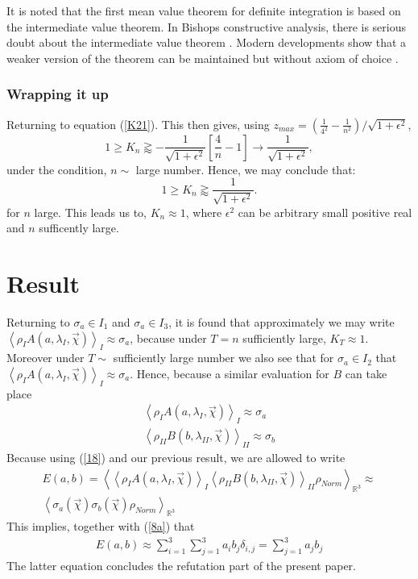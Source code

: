 \documentclass{appolb}
\begin{document}
It is noted that the first mean value theorem for definite integration is based on the intermediate value theorem. 
In Bishops constructive analysis, there is serious doubt about the intermediate value theorem \cite[ introduction section]{BISH}. Modern developments show that a weaker version of the theorem can be maintained but without axiom of choice \cite{Hen}. 
\subsubsection{Wrapping it up}\label{PartD}
Returning to equation (\ref{K21}). This then gives, using $z_{max}=\left( \frac{1}{4^2}-\frac{1}{n^2} \right)/\sqrt{1+\epsilon^2}$,
\begin{equation}\label{K22}
1 \geq K_n \gtrapprox -\frac{1}{\sqrt{1+\epsilon^2}}\left[\frac{4}{n} -1  \right]  \rightarrow  \frac{1}{\sqrt{1+\epsilon^2}},
\end{equation}
under the condition, $n \sim$ large number. 
Hence, we may conclude that: \[1 \geq  K_{n} \gtrapprox \frac{1}{\sqrt{1+\epsilon^2}}.\]
for $n$ large. This leads us to,  $K_n \approx 1$, where $\epsilon^2$ can be arbitrary small positive real and $n$ sufficently large. 

\section{Result}
Returning to $\sigma_a \in I_1$ and $\sigma_a \in I_3$, it is found that approximately we may write $\left \langle \rho_{I} A(a,\lambda_{I},\vec{\chi})\right\rangle_{I}\approx \sigma_a$, because under $T=n$ sufficiently large, $K_T \approx 1$. 
Moreover under $T \sim $ sufficiently large number we also see that for $\sigma_a \in I_2$ that $\left \langle \rho_{I} A(a,\lambda_{I},\vec{\chi})\right\rangle_{I}\approx \sigma_a$. Hence, because a similar evaluation for $B$ can take place
\begin{eqnarray}\label{R1}
\left \langle \rho_{I} A(a,\lambda_{I},\vec{\chi})\right\rangle_{I}\approx \sigma_a \nonumber \\
\left \langle \rho_{II} B(b,\lambda_{II},\vec{\chi})\right\rangle_{II}\approx \sigma_b
\end{eqnarray}
Because using (\ref{18}) and our previous result, we are allowed to write 
\begin{eqnarray}\label{R2}
E(a,b)=\left \langle \left \langle \rho_{I} A(a,\lambda_{I},\vec{\chi})\right\rangle_{I}\left \langle \rho_{II}B(b,\lambda_{II},\vec{\chi}) \right\rangle_{II}\rho_{Norm} \right\rangle_{\mathbb{R}^3}\approx \nonumber \\
\left \langle \sigma_a (\vec{\chi}) \sigma_b(\vec{\chi}) \rho_{Norm} \right\rangle_{\mathbb{R}^3} 
\end{eqnarray}
This implies, together with (\ref{8a})  that 
\begin{eqnarray}\label{R3}
E(a,b)\approx \sum_{i=1}^3 \sum_{j=1}^3 a_i b_j \delta_{i,j} = \sum_{j=1}^3 a_j b_j
\end{eqnarray}
The latter equation concludes the refutation part of the present paper.
\end{document}
